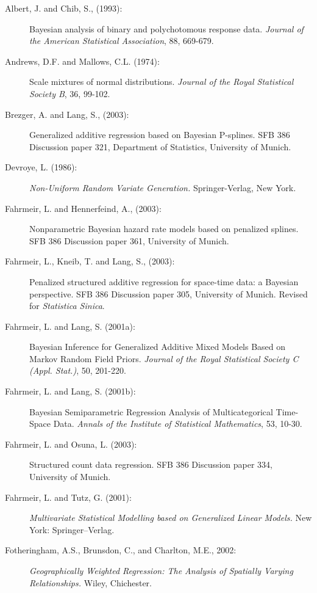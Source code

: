 \begin{description}
\item[Albert, J. and Chib, S., (1993):]
Bayesian analysis of binary and polychotomous response data. {\it
Journal of the American Statistical Association},  88, 669-679.


\item[Andrews, D.F. and Mallows, C.L. (1974):]
Scale mixtures of normal distributions. {\it Journal of the Royal
Statistical Society B}, 36, 99-102.


\item[Brezger, A. and Lang, S., (2003):]
Generalized additive regression based on Bayesian P-splines. SFB
386 Discussion paper 321, Department of Statistics, University of
Munich.

\item[Devroye, L. (1986):]
{\it Non-Uniform Random Variate Generation.} Springer-Verlag, New
York.


\item[Fahrmeir, L. and Hennerfeind, A., (2003):]
Nonparametric Bayesian hazard rate models based on penalized
splines. SFB 386 Discussion paper 361, University of Munich.

\item[Fahrmeir, L., Kneib, T. and Lang, S., (2003):]
Penalized structured additive regression for space-time data: a
Bayesian perspective. SFB 386 Discussion paper 305, University of
Munich. Revised for {\em Statistica Sinica}.


\item[Fahrmeir, L. and Lang, S. (2001a):]
Bayesian Inference for Generalized Additive Mixed Models Based on
Markov Random Field Priors. {\em Journal of the Royal Statistical
Society C (Appl. Stat.)}, 50, 201-220.

\item[Fahrmeir, L. and Lang, S. (2001b):] Bayesian Semiparametric Regression Analysis of Multicategorical
Time-Space Data. {\em Annals of the  Institute of Statistical
Mathematics}, 53, 10-30.

\item[Fahrmeir, L. and Osuna, L. (2003):] Structured count data regression.
SFB 386 Discussion paper 334, University of Munich.

\item[Fahrmeir, L. and Tutz, G. (2001):] {\em Multivariate Statistical
Modelling based on Generalized Linear Models.} New York:
Springer--Verlag.

\item[Fotheringham, A.S., Brunsdon, C., and Charlton, M.E., 2002:]
{\it Geographically Weighted Regression: The Analysis of Spatially
Varying Relationships.} Wiley, Chichester.



\end{description}
